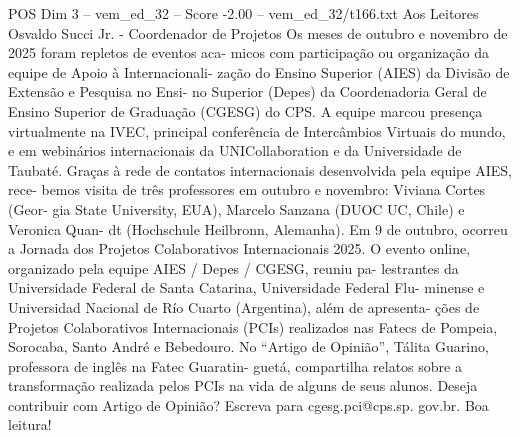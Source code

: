 \begin{textsample}{POS Dim 3 – vem\_ed\_32 – Score -2.00 – vem\_ed\_32/t166.txt}  \label{ex:f3_pos_097}
Aos Leitores Osvaldo Succi Jr. - Coordenador de Projetos Os meses de outubro e novembro de 2025 foram repletos de eventos aca- micos com participação ou organização da equipe de Apoio à Internacionali- zação do Ensino Superior (AIES) da Divisão de Extensão e Pesquisa no Ensi- no Superior (Depes) da Coordenadoria Geral de Ensino Superior de Graduação (CGESG) do CPS.
A equipe marcou presença virtualmente na IVEC, principal conferência de Intercâmbios Virtuais do mundo, e em webinários internacionais da UNICollaboration e da Universidade de Taubaté.
Graças à rede de contatos internacionais desenvolvida pela equipe AIES, rece- bemos visita de três professores em outubro e novembro: Viviana Cortes (Geor- gia State University, EUA), Marcelo Sanzana (DUOC UC, Chile) e Veronica Quan- dt (Hochschule Heilbronn, Alemanha).
Em 9 de outubro, ocorreu a Jornada dos Projetos Colaborativos Internacionais 2025.
O evento online, organizado pela equipe AIES / Depes / CGESG, reuniu pa- lestrantes da Universidade Federal de Santa Catarina, Universidade Federal Flu- minense e Universidad Nacional de Río Cuarto (Argentina), além de apresenta- ções de Projetos Colaborativos Internacionais (PCIs) realizados nas Fatecs de Pompeia, Sorocaba, Santo André e Bebedouro.
No “Artigo de Opinião”, Tálita Guarino, professora de inglês na Fatec Guaratin- guetá, compartilha relatos sobre a transformação realizada pelos PCIs na vida de alguns de seus alunos.
Deseja contribuir com Artigo de Opinião?
Escreva para cgesg.pci@cps.sp. gov.br.
Boa leitura!

\end{textsample}
